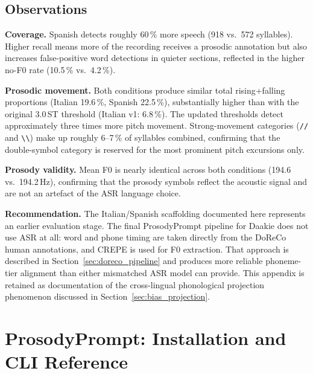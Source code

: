 \section*{Observations}

\textbf{Coverage.}
Spanish detects roughly 60\,\% more speech (918 vs.\ 572 syllables).
Higher recall means more of the recording receives a prosodic annotation
but also increases false-positive word detections in quieter sections,
reflected in the higher no-F0 rate (10.5\,\% vs.\ 4.2\,\%).

\textbf{Prosodic movement.}
Both conditions produce similar total rising+falling proportions
(Italian 19.6\,\%, Spanish 22.5\,\%), substantially higher than with the
original 3.0\,ST threshold (Italian v1: 6.8\,\%).
The updated thresholds detect approximately three times more pitch movement.
Strong-movement categories (\texttt{//} and
\texttt{\textbackslash\textbackslash}) make up roughly 6--7\,\% of syllables
combined, confirming that the double-symbol category is reserved for the
most prominent pitch excursions only.

\textbf{Prosody validity.}
Mean F0 is nearly identical across both conditions (194.6 vs.\ 194.2\,Hz),
confirming that the prosody symbols reflect the acoustic signal and are not
an artefact of the ASR language choice.

\textbf{Recommendation.}
The Italian/Spanish scaffolding documented here represents an earlier evaluation
stage. The final ProsodyPrompt pipeline for Daakie does not use ASR at all:
word and phone timing are taken directly from the DoReCo human annotations,
and CREPE is used for F0 extraction. That approach is described in
Section~\ref{sec:doreco_pipeline} and produces more reliable phoneme-tier
alignment than either mismatched ASR model can provide.
This appendix is retained as documentation of the cross-lingual phonological
projection phenomenon discussed in Section~\ref{sec:bias_projection}.


\chapter{ProsodyPrompt: Installation and CLI Reference}
\label{app:speechprint_cli}

\begin{center}
\end{center}

